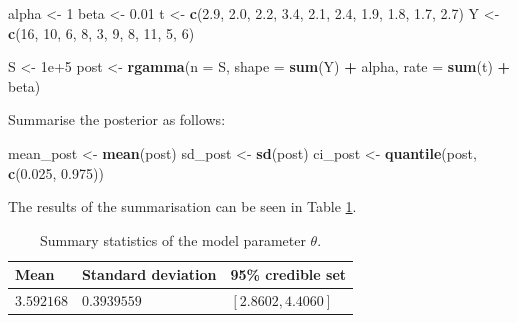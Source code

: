 \documentclass[
]{homework}
\newenvironment{Shaded}{\begin{snugshade}}{\end{snugshade}}
\newcommand{\AttributeTok}[1]{\textcolor[rgb]{0.13,0.29,0.53}{#1}}
\newcommand{\DecValTok}[1]{\textcolor[rgb]{0.00,0.00,0.81}{#1}}
\newcommand{\FloatTok}[1]{\textcolor[rgb]{0.00,0.00,0.81}{#1}}
\newcommand{\FunctionTok}[1]{\textcolor[rgb]{0.13,0.29,0.53}{\textbf{#1}}}
\newcommand{\NormalTok}[1]{#1}
\newcommand{\OtherTok}[1]{\textcolor[rgb]{0.56,0.35,0.01}{#1}}
\newcommand{\SpecialCharTok}[1]{\textcolor[rgb]{0.81,0.36,0.00}{\textbf{#1}}}
\begin{document}
\begin{Shaded}
\begin{Highlighting}[]
\NormalTok{alpha }\OtherTok{\textless{}{-}} \DecValTok{1}
\NormalTok{beta  }\OtherTok{\textless{}{-}} \FloatTok{0.01}
\NormalTok{t     }\OtherTok{\textless{}{-}} \FunctionTok{c}\NormalTok{(}\FloatTok{2.9}\NormalTok{, }\FloatTok{2.0}\NormalTok{, }\FloatTok{2.2}\NormalTok{, }\FloatTok{3.4}\NormalTok{, }\FloatTok{2.1}\NormalTok{, }\FloatTok{2.4}\NormalTok{, }\FloatTok{1.9}\NormalTok{, }\FloatTok{1.8}\NormalTok{, }\FloatTok{1.7}\NormalTok{, }\FloatTok{2.7}\NormalTok{)}
\NormalTok{Y     }\OtherTok{\textless{}{-}} \FunctionTok{c}\NormalTok{(}\DecValTok{16}\NormalTok{, }\DecValTok{10}\NormalTok{, }\DecValTok{6}\NormalTok{, }\DecValTok{8}\NormalTok{, }\DecValTok{3}\NormalTok{, }\DecValTok{9}\NormalTok{, }\DecValTok{8}\NormalTok{, }\DecValTok{11}\NormalTok{, }\DecValTok{5}\NormalTok{, }\DecValTok{6}\NormalTok{)}

\NormalTok{S    }\OtherTok{\textless{}{-}} \FloatTok{1e+5}
\NormalTok{post }\OtherTok{\textless{}{-}} \FunctionTok{rgamma}\NormalTok{(}\AttributeTok{n =}\NormalTok{ S, }\AttributeTok{shape =} \FunctionTok{sum}\NormalTok{(Y) }\SpecialCharTok{+}\NormalTok{ alpha, }\AttributeTok{rate =} \FunctionTok{sum}\NormalTok{(t) }\SpecialCharTok{+}\NormalTok{ beta)}
\end{Highlighting}
\end{Shaded}

Summarise the posterior as follows:

\begin{Shaded}
\begin{Highlighting}[]
\NormalTok{mean\_post }\OtherTok{\textless{}{-}} \FunctionTok{mean}\NormalTok{(post)}
\NormalTok{sd\_post   }\OtherTok{\textless{}{-}} \FunctionTok{sd}\NormalTok{(post)}
\NormalTok{ci\_post   }\OtherTok{\textless{}{-}} \FunctionTok{quantile}\NormalTok{(post, }\FunctionTok{c}\NormalTok{(}\FloatTok{0.025}\NormalTok{, }\FloatTok{0.975}\NormalTok{))}
\end{Highlighting}
\end{Shaded}

The results of the summarisation can be seen in Table \ref{tab:ex1-sum-stats}.

\begin{table}[H]
  \centering
  \begin{tabular}{lll}
    \toprule
    Mean & Standard deviation & 95\% credible set \\
    \midrule
    $3.592168$    & $0.3939559$                 & $[2.8602, 4.4060]$ \\
    \bottomrule
  \end{tabular}
  \caption{Summary statistics of the model parameter $\theta$.}
  \label{tab:ex1-sum-stats}
\end{table}
\end{document}
